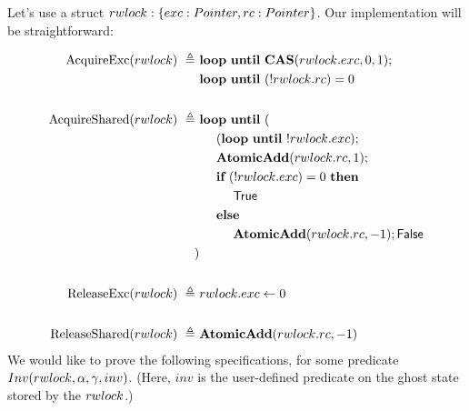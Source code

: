 \documentclass{article}
\newcommand{\true}{\textsf{True}}
\newcommand{\false}{\textsf{False}}
\renewcommand{\eqdef}{\triangleq}
\begin{document}
\newcommand{\langassign}{\leftarrow}
\newcommand{\langloop}{\textbf{loop}}
\newcommand{\until}{\textbf{until}}
\newcommand{\langif}{\textbf{if}}
\newcommand{\langthen}{\textbf{then}}
\newcommand{\langelse}{\textbf{else}}
\newcommand{\langmatch}{\textbf{match}}
\newcommand{\langwith}{\textbf{with}}
\newcommand{\langend}{\textbf{end}}
\newcommand{\langlet}{\textbf{let}~}
\newcommand{\langref}{\textbf{ref}}
\newcommand{\langin}{\textbf{in}}

\newcommand{\CAS}{\textbf{CAS}}
\newcommand{\AtomicAdd}{\textbf{AtomicAdd}}

\newcommand{\Inv}{Inv}
\newcommand{\inv}{inv}
\newcommand{\HTInv}{HTInv}
\newcommand{\Heap}{Heap}
\newcommand{\htinv}{htinv}
\newcommand{\inlinehoare}[1]{{\color{blue}\left\{#1\right\}}}

Let's use a struct $rwlock : \{exc: Pointer, rc: Pointer\}$. Our implementation will be straightforward:

\begin{align*}
  \AcquireExc(\rwlock) ~\eqdef~
      & \langloop~\until~\CAS(\rwlock.\exc,0,1);\\
      & \langloop~\until~(!\rwlock.\rc) = 0\\
      \\
  \AcquireShared(\rwlock) ~\eqdef~
      & \langloop~\until~(\\
        & ~~~~ (\langloop~\until~!\rwlock.\exc);\\
        & ~~~~ \AtomicAdd(\rwlock.\rc, 1);\\
        & ~~~~ \langif~ (!\rwlock.\exc) = 0 ~\langthen\\
        & ~~~~~~~~ \true\\
        & ~~~~ \langelse\\
        & ~~~~~~~~ \AtomicAdd(\rwlock.\rc, -1); \false\\
      )\\
      \\
  \ReleaseExc(\rwlock) ~\eqdef~
      & \rwlock.\exc \langassign 0\\
      \\
  \ReleaseShared(\rwlock) ~\eqdef~
      & \AtomicAdd(\rwlock.\rc, -1)
\end{align*}
We would like to prove the following specifications, for some predicate $\Inv(\rwlock,\alpha,\gamma,\inv)$. (Here, $\inv$ is the user-defined predicate on the ghost state stored by the $rwlock$.)
\end{document}
